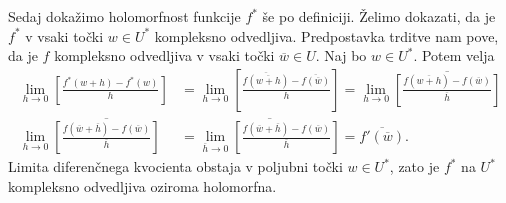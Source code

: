 \documentclass[mat1, tisk]{fmfdelo}
\begin{document}
\begin{dokaz}
        Sedaj dokažimo holomorfnost funkcije $f^*$ še po definiciji. Želimo dokazati, da je $f^*$ v vsaki točki $w \in U^*$ kompleksno odvedljiva. Predpostavka trditve nam pove, da je $f$ kompleksno odvedljiva v vsaki točki $\overline{w} \in U$.
        Naj bo $w \in U^*$. Potem velja
        \begin{align*}
            \lim_{h \to 0}\left[{\frac{f^*(w + h) - f^*(w)}{h}}\right] &= \lim_{h \to 0}\left[{\frac{\overline{f\left(\overline{w + h}\right)} - \overline{f(\overline{w})}}{h}}\right] = \lim_{h \to 0}{\overline{\left[\frac{f\left(\overline{w + h}\right) - f(\overline{w})}{\overline{h}}\right]}} \\
            \lim_{h \to 0}{\overline{\left[\frac{f\left(\overline{w} + \overline{h}\right) - f(\overline{w})}{\overline{h}}\right]}} & = \overline{\lim_{\overline{h} \to 0}{\left[\frac{f\left(\overline{w} + \overline{h}\right) - f(\overline{w})}{\overline{h}}\right]}} = \overline{f'(\overline{w})}.
        \end{align*}
        Limita diferenčnega kvocienta obstaja v poljubni točki $w \in U^*$, zato je $f^*$ na $U^*$ kompleksno odvedljiva oziroma holomorfna.
    \end{dokaz}
\end{document}
